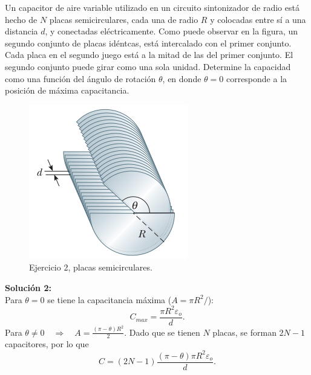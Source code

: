\begin{mdframed}[style=warning]
	\begin{ejercicio}
		\begin{multicols}{2}
			Un capacitor de aire variable utilizado en un circuito sintonizador de radio está hecho de $N$ placas semicirculares, cada una de radio $R$ y colocadas entre sí a una distancia $d$, y conectadas eléctricamente. Como puede observar en la figura, un segundo conjunto de placas idéntcas, está intercalado con el primer conjunto. Cada placa en el segundo juego está a la mitad de las del primer conjunto. El segundo conjunto puede girar como una sola unidad. Determine la capacidad como una función del ángulo de rotación $\theta$, en donde $\theta = 0$ corresponde a la posición de máxima capacitancia.
			\columnbreak
			\begin{figure}[H]
				\centering
				\includegraphics[scale=0.55]{./img/cap.png}
				\caption{Ejercicio 2, placas semicirculares.}
				\label{ej2}
			\end{figure}
		\end{multicols}
	\end{ejercicio}
	\textbf{Solución 2: } \\
	Para $\theta = 0$ se tiene la capacitancia máxima ($A = \pi R^2 /$):
		$$ C_{max} = \frac{\pi R^2 \varepsilon _o}{d}. $$
	Para $\theta \neq 0 \quad \Rightarrow \quad A = \frac{(\pi - \theta)R^2}{2} $. Dado que se tienen $N$ placas, se forman $2N - 1$ capacitores, por lo que
		$$ \boxed{ C = (2N - 1)\frac{(\pi - \theta) \pi R^2 \varepsilon _o}{d}. } $$
\end{mdframed}




